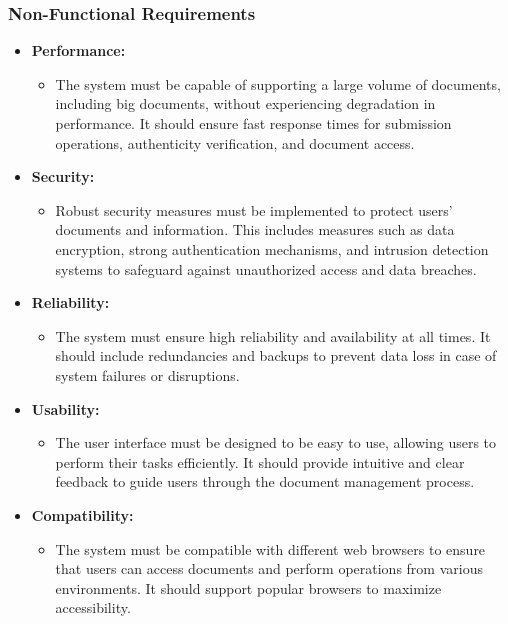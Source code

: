 \documentclass[a4paper,11pt]{article}
\begin{document}
    \subsubsection{Non-Functional Requirements}
        \begin{itemize}
            \item \textbf{Performance:} 
            \begin{itemize}
                \item The system must be capable of supporting a large volume of documents, including big documents, without experiencing degradation in performance. It should ensure fast response times for submission operations, authenticity verification, and document access.
            \end{itemize}
            
            \item \textbf{Security:} 
            \begin{itemize}
                \item Robust security measures must be implemented to protect users' documents and information. This includes measures such as data encryption, strong authentication mechanisms, and intrusion detection systems to safeguard against unauthorized access and data breaches.
            \end{itemize}
            
            \item \textbf{Reliability:} 
            \begin{itemize}
                \item The system must ensure high reliability and availability at all times. It should include redundancies and backups to prevent data loss in case of system failures or disruptions.
            \end{itemize}
            
            \item \textbf{Usability:} 
            \begin{itemize}
                \item The user interface must be designed to be easy to use, allowing users to perform their tasks efficiently. It should provide intuitive and clear feedback to guide users through the document management process.
            \end{itemize}
            
            \item \textbf{Compatibility:} 
            \begin{itemize}
                \item The system must be compatible with different web browsers to ensure that users can access documents and perform operations from various environments. It should support popular browsers to maximize accessibility.
            \end{itemize}
            

\end{itemize}
\end{document}
